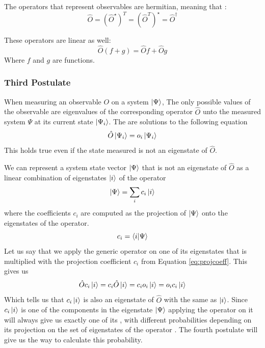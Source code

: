 \documentclass[../master_thesis.tex]{subfiles}
\begin{document}
The operators that represent observables are hermitian, meaning that
\cite{Cohen:1973}:
\begin{equation}
  \hat{O} = (\hat{O}^{\star})^T = (\hat{O}^T)^{\star} = \hat{O}^{\dagger}
\end{equation}

These operators are linear as well:
\begin{equation}
    \hat{O}(f + g) = \hat{O}f + \hat{O}g\label{eq:oplinearity}
\end{equation}
Where $f$ and $g$ are functions.

\subsubsection{Third Postulate}
When measuring an observable $O$ on a system $\ket{\Psi}$, The only possible
values of the observable are eigenvalues of the corresponding operator $\hat{O}$
unto the measured system $\Psi$ at its current state $\ket{\Psi_i}$. The \eivals
are solutions to the following equation \cite{Cohen:1973}
\begin{equation}
  \hat{O}\ket{\Psi_i} = o_i \ket{\Psi_i}
\end{equation}
This holds true even if the state measured is not an eigenstate of $\hat{O}$.

We can represent a system state vector $\ket{\Psi}$ that is not an eigenstate
of $\hat{O}$ as a linear combination of eigenstates $\ket{i}$ of the operator
\begin{equation}
  \ket{\Psi} = \sum_i c_i \ket{i}
\end{equation}
where the coefficients $c_i$ are computed as the projection of $\ket{\Psi}$ onto
the eigenstates of the operator.
\begin{equation}\label{eq:projcoeff}
  c_i = \braket{i|\Psi}
\end{equation}
Let us say that we apply the generic operator on one of its eigenstates that
is multiplied with the projection coefficient $c_i$ from Equation \ref{eq:projcoeff}.
This gives us
\begin{equation}
  \hat{O}c_i\ket{i} = c_i\hat{O}\ket{i} = c_i o_i\ket{i} = o_i c_i\ket{i}
\end{equation}
Which tells  us that $c_i\ket{i}$ is also an eigenstate of $\hat{O}$ with the
same \eival as $\ket{i}$. Since $c_i\ket{i}$ is one of the components in the
eigenstate $\ket{\Psi}$ applying the operator on it will always give us exactly
one of its \eivals, with different probabilities  depending on its projection on the set
of eigenstates of the operator \cite{Cohen:1973}. The fourth postulate will give
us the way to calculate this probability.
\end{document}
